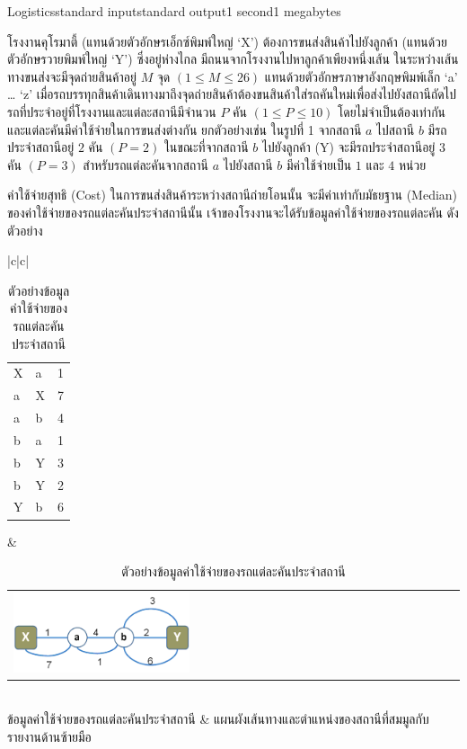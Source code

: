 \documentclass[11pt,a4paper]{article}
\begin{document}
\begin{problem}{Logistics}{standard input}{standard output}{1 second}{1 megabytes}

โรงงานคุโรมาตี้ (แทนด้วยตัวอักษรเอ็กซ์พิมพ์ใหญ่ ‘X’) ต้องการขนส่งสินค้าไปยังลูกค้า (แทนด้วยตัวอักษรวายพิมพ์ใหญ่ ‘Y’) ซึ่งอยู่ห่างไกล มีถนนจากโรงงานไปหาลูกค้าเพียงหนึ่งเส้น ในระหว่างเส้นทางขนส่งจะมีจุดถ่ายสินค้าอยู่ $M$ จุด $(1 \leq M \leq 26)$ แทนด้วยตัวอักษรภาษาอังกฤษพิมพ์เล็ก ‘a’ … ‘z’ เมื่อรถบรรทุกสินค้าเดินทางมาถึงจุดถ่ายสินค้าต้องขนสินค้าใส่รถคันใหม่เพื่อส่งไปยังสถานีถัดไป รถที่ประจำอยู่ที่โรงงานและแต่ละสถานีมีจำนวน $P$ คัน $(1 \leq P \leq 10)$ โดยไม่จำเป็นต้องเท่ากัน และแต่ละคันมีค่าใช้จ่ายในการขนส่งต่างกัน ยกตัวอย่างเช่น ในรูปที่ 1 จากสถานี $a$ ไปสถานี $b$ มีรถประจำสถานีอยู่ $2$ คัน $(P = 2)$ ในขณะที่จากสถานี $b$ ไปยังลูกค้า (Y) จะมีรถประจำสถานีอยู่ $3$ คัน $(P = 3)$ สำหรับรถแต่ละคันจากสถานี $a$ ไปยังสถานี $b$ มีค่าใช้จ่ายเป็น $1$ และ $4$ หน่วย

ค่าใช้จ่ายสุทธิ (Cost) ในการขนส่งสินค้าระหว่างสถานีถ่ายโอนนั้น จะมีค่าเท่ากับมัธยฐาน (Median) ของค่าใช้จ่ายของรถแต่ละคันประจำสถานีนั้น เจ้าของโรงงานจะได้รับข้อมูลค่าใช้จ่ายของรถแต่ละคัน ดังตัวอย่าง

\begin{table}[h]
\begin{center}
\begin{tabular}{|c|c|}
\hline
\centering
\begin{tabular}{lll}
X      &    a   &       1\\
a       &   X       &   7\\
a    &      b    &      4\\
b    &      a      &    1\\
b    &      Y    &      3\\
b    &     Y     &     2\\
Y     &     b   &       6
\end{tabular}%
& 
\begin{tabular}{l}
\\
\includegraphics[width=0.4\textwidth]{../latex/img/1063/1063-1.png}\\
\end{tabular}\\
ข้อมูลค่าใช้จ่ายของรถแต่ละคันประจำสถานี & แผนผังเส้นทางและตำแหน่งของสถานีที่สมมูลกับรายงานด้านซ้ายมือ \\
\hline
\end{tabular}
\caption{ตัวอย่างข้อมูลค่าใช้จ่ายของรถแต่ละคันประจำสถานี}
\end{center}
\end{table}


\end{problem}
\end{document}
